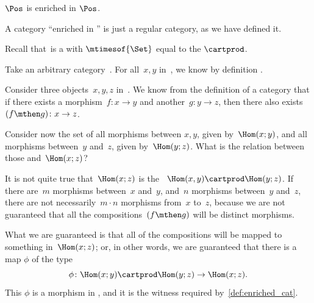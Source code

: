     \begin{example}
        $\Pos$ is enriched in $\Pos$.
    \end{example}

    \begin{example}
    \end{example}

    \begin{example}
        A category ``enriched in \Set'' is just a regular category, as we have defined it.

        Recall that~\Set is a  with $\mtimesof{\Set}$ equal to the  $\cartprod$.

        Take an arbitrary category~\CatC.
        For all~$x, y$ in~\CatC, we know by definition .

        Consider three objects~$x,y,z$ in~\CatC.
        We know from the definition of a category that if there exists a morphism~$f: x \to y$ and another~$g: y \to z$, then there also exists~$(f\mthen g)\colon x \to z$.

        Consider now the set of all morphisms between $x, y$, given by~$\Hom(x;y)$, and all morphisms between~$y$ and~$z$, given by~$\Hom(y; z)$.
        What is the relation between those  and~$\Hom(x; z)$?

        It is not quite true that~$\Hom(x; z)$ is the ~$\Hom(x, y) \cartprod \Hom(y; z)$.
        If there are~$m$ morphisms between~$x$ and~$y$, and~$n$ morphisms between~$y$ and~$z$, there are not necessarily~$m \cdot n$ morphisms from~$x$ to~$z$, because we are not guaranteed that all the compositions~$(f\mthen g)$ will be distinct morphisms.

        What we are guaranteed is that all of the compositions will be mapped to something in~$\Hom(x; z)$; or, in other words, we are guaranteed that there is a map $\phi$ of the type
        \begin{equation}
            \phi \colon \Hom(x; y) \cartprod \Hom(y; z) \rightarrow \Hom(x; z).
        \end{equation}
        This $\phi$ is a morphism in \Set, and it is the witness required by~\cref{def:enriched_cat}.

    \end{example}
    


